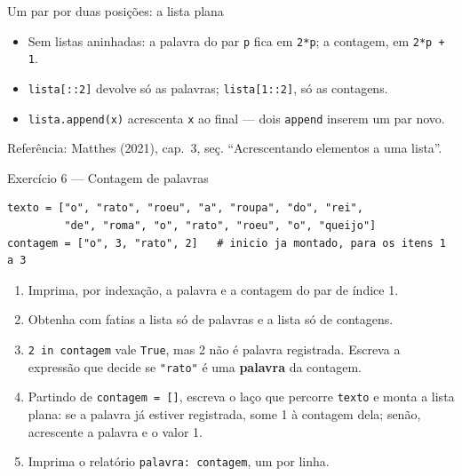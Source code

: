 \documentclass[aspectratio=169]{beamer}
\newcommand{\fonte}[1]{\vfill{\scriptsize\color{UFSGray}Refer\^encia: #1}}
\begin{document}
\begin{frame}[fragile]{Um par por duas posições: a lista plana}
\begin{center}
\end{center}

\begin{itemize}
  \item Sem listas aninhadas: a palavra do par \texttt{p} fica em \texttt{2*p}; a contagem, em \texttt{2*p + 1}.
  \item \texttt{lista[::2]} devolve só as palavras; \texttt{lista[1::2]}, só as contagens.
  \item \texttt{lista.append(x)} acrescenta \texttt{x} ao final --- dois \texttt{append} inserem um par novo.
\end{itemize}

\fonte{Matthes (2021), cap.\ 3, se\c{c}. ``Acrescentando elementos a uma lista''.}
\end{frame}

\begin{frame}[fragile]{Exercício 6 --- Contagem de palavras}
\begin{lstlisting}
texto = ["o", "rato", "roeu", "a", "roupa", "do", "rei",
         "de", "roma", "o", "rato", "roeu", "o", "queijo"]
contagem = ["o", 3, "rato", 2]   # inicio ja montado, para os itens 1 a 3
\end{lstlisting}

\begin{enumerate}
  \item Imprima, por indexação, a palavra e a contagem do par de índice 1.
  \item Obtenha com fatias a lista só de palavras e a lista só de contagens.
  \item \texttt{2 in contagem} vale \texttt{True}, mas 2 não é palavra registrada. Escreva a expressão que decide se \texttt{"rato"} é uma \textbf{palavra} da contagem.
  \item Partindo de \texttt{contagem = []}, escreva o laço que percorre \texttt{texto} e monta a lista plana: se a palavra já estiver registrada, some 1 à contagem dela; senão, acrescente a palavra e o valor 1.
  \item Imprima o relatório \texttt{palavra: contagem}, um por linha.
\end{enumerate}
\end{frame}
\end{document}
